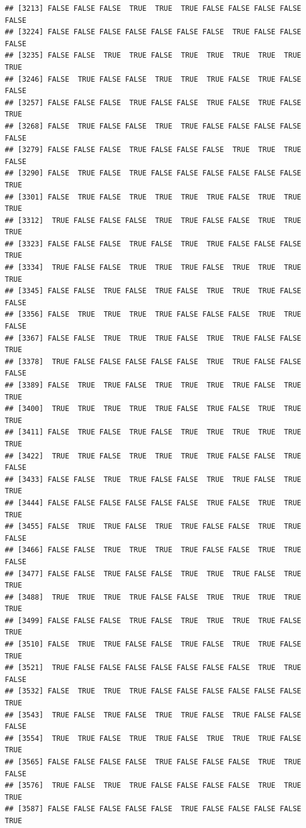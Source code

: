 \documentclass{article}\usepackage[]{graphicx}\usepackage[]{color}
\makeatletter
\newenvironment{kframe}{%
 \def\at@end@of@kframe{}%
 \ifinner\ifhmode%
  \def\at@end@of@kframe{\end{minipage}}%
  \begin{minipage}{\columnwidth}%
 \fi\fi%
 \def\FrameCommand##1{\hskip\@totalleftmargin \hskip-\fboxsep
 \colorbox{shadecolor}{##1}\hskip-\fboxsep
     \hskip-\linewidth \hskip-\@totalleftmargin \hskip\columnwidth}%
 \MakeFramed {\advance\hsize-\width
   \@totalleftmargin\z@ \linewidth\hsize
   \@setminipage}}%
 {\par\unskip\endMakeFramed%
 \at@end@of@kframe}
\newenvironment{knitrout}{}{} %
\makeatother
\begin{document}
\begin{knitrout}
\begin{kframe}
\begin{verbatim}
## [3213] FALSE FALSE FALSE  TRUE  TRUE  TRUE FALSE FALSE FALSE FALSE FALSE
## [3224] FALSE FALSE FALSE FALSE FALSE FALSE FALSE  TRUE FALSE FALSE FALSE
## [3235] FALSE FALSE  TRUE  TRUE FALSE  TRUE  TRUE  TRUE  TRUE  TRUE  TRUE
## [3246] FALSE  TRUE FALSE FALSE  TRUE  TRUE  TRUE FALSE  TRUE FALSE FALSE
## [3257] FALSE FALSE FALSE  TRUE FALSE FALSE  TRUE FALSE  TRUE FALSE  TRUE
## [3268] FALSE  TRUE FALSE FALSE  TRUE  TRUE FALSE FALSE FALSE FALSE FALSE
## [3279] FALSE FALSE FALSE  TRUE FALSE FALSE FALSE  TRUE  TRUE  TRUE FALSE
## [3290] FALSE  TRUE FALSE  TRUE FALSE FALSE FALSE FALSE FALSE FALSE  TRUE
## [3301] FALSE  TRUE FALSE  TRUE  TRUE  TRUE  TRUE FALSE  TRUE  TRUE  TRUE
## [3312]  TRUE FALSE FALSE FALSE  TRUE  TRUE FALSE FALSE  TRUE  TRUE  TRUE
## [3323] FALSE FALSE FALSE  TRUE FALSE  TRUE  TRUE FALSE FALSE FALSE  TRUE
## [3334]  TRUE FALSE FALSE  TRUE  TRUE  TRUE FALSE  TRUE  TRUE  TRUE  TRUE
## [3345] FALSE FALSE  TRUE FALSE  TRUE FALSE  TRUE  TRUE  TRUE FALSE FALSE
## [3356] FALSE  TRUE  TRUE  TRUE  TRUE FALSE FALSE FALSE  TRUE  TRUE FALSE
## [3367] FALSE FALSE  TRUE  TRUE  TRUE FALSE  TRUE  TRUE FALSE FALSE  TRUE
## [3378]  TRUE FALSE FALSE FALSE FALSE FALSE  TRUE  TRUE FALSE FALSE FALSE
## [3389] FALSE  TRUE  TRUE FALSE  TRUE  TRUE  TRUE  TRUE FALSE  TRUE  TRUE
## [3400]  TRUE  TRUE  TRUE  TRUE  TRUE FALSE  TRUE FALSE  TRUE  TRUE  TRUE
## [3411] FALSE  TRUE FALSE  TRUE FALSE  TRUE  TRUE  TRUE  TRUE  TRUE  TRUE
## [3422]  TRUE  TRUE FALSE  TRUE  TRUE  TRUE  TRUE FALSE FALSE  TRUE FALSE
## [3433] FALSE FALSE  TRUE  TRUE FALSE FALSE  TRUE  TRUE FALSE  TRUE  TRUE
## [3444] FALSE FALSE FALSE FALSE FALSE FALSE  TRUE FALSE  TRUE  TRUE  TRUE
## [3455] FALSE  TRUE  TRUE FALSE  TRUE  TRUE FALSE FALSE  TRUE  TRUE FALSE
## [3466] FALSE FALSE  TRUE  TRUE  TRUE  TRUE FALSE FALSE  TRUE  TRUE FALSE
## [3477] FALSE FALSE  TRUE FALSE FALSE  TRUE  TRUE  TRUE FALSE  TRUE  TRUE
## [3488]  TRUE  TRUE  TRUE  TRUE FALSE FALSE  TRUE  TRUE  TRUE  TRUE  TRUE
## [3499] FALSE FALSE FALSE  TRUE FALSE  TRUE  TRUE  TRUE  TRUE FALSE  TRUE
## [3510] FALSE  TRUE  TRUE FALSE FALSE  TRUE FALSE  TRUE  TRUE FALSE  TRUE
## [3521]  TRUE FALSE FALSE FALSE FALSE FALSE FALSE FALSE  TRUE  TRUE FALSE
## [3532] FALSE  TRUE  TRUE  TRUE FALSE FALSE FALSE FALSE FALSE FALSE  TRUE
## [3543]  TRUE FALSE  TRUE FALSE  TRUE  TRUE FALSE  TRUE FALSE FALSE FALSE
## [3554]  TRUE  TRUE FALSE  TRUE  TRUE FALSE  TRUE  TRUE  TRUE FALSE  TRUE
## [3565] FALSE FALSE FALSE FALSE  TRUE FALSE FALSE FALSE  TRUE  TRUE FALSE
## [3576]  TRUE FALSE  TRUE  TRUE FALSE FALSE FALSE FALSE  TRUE  TRUE  TRUE
## [3587] FALSE FALSE FALSE FALSE FALSE  TRUE FALSE FALSE FALSE FALSE  TRUE

\end{verbatim}
\end{kframe}
\end{knitrout}
\end{document}
